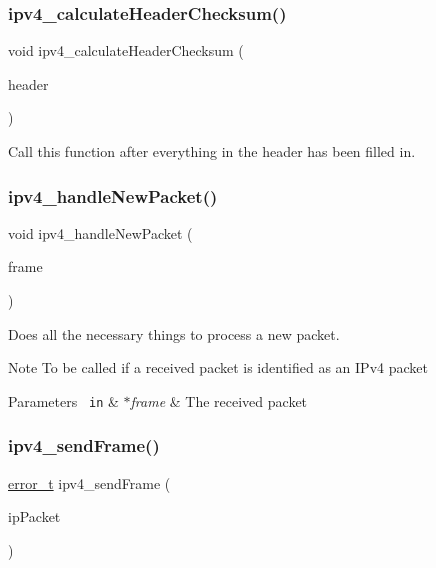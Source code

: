 \subsubsection{\texorpdfstring{ipv4\_calculateHeaderChecksum()}{ipv4\_calculateHeaderChecksum()}}
{\footnotesize\ttfamily void ipv4\+\_\+calculate\+Header\+Checksum (\begin{DoxyParamCaption}\item[{\mbox{\hyperlink{group__ipv4_gaf4f2c6743b9fb1ea3c69734612ce41de}{ipv4\+\_\+header\+\_\+t}} $\ast$}]{header }\end{DoxyParamCaption})}



Call this function after everything in the header has been filled in. 

\mbox{\label{group__ipv4_ga7f96d526bafe55783b675597634d87ae}} 
\subsubsection{\texorpdfstring{ipv4\_handleNewPacket()}{ipv4\_handleNewPacket()}}
{\footnotesize\ttfamily void ipv4\+\_\+handle\+New\+Packet (\begin{DoxyParamCaption}\item[{\mbox{\hyperlink{group__ethernet_ga7519a7ae14b490659069435698d28a25}{ethernet\+Frame\+\_\+t}} $\ast$}]{frame }\end{DoxyParamCaption})}



Does all the necessary things to process a new packet. 

\begin{DoxyNote}{Note}
To be called if a received packet is identified as an I\+Pv4 packet 
\end{DoxyNote}

\begin{DoxyParams}[1]{Parameters}
\mbox{\texttt{ in}}  & {\em $\ast$frame} & The received packet \\
\hline
\end{DoxyParams}
\mbox{\label{group__ipv4_ga1837c9c3c1856f57fe1d5ec5008015a2}} 
\subsubsection{\texorpdfstring{ipv4\_sendFrame()}{ipv4\_sendFrame()}}
{\footnotesize\ttfamily \mbox{\hyperlink{group__error_gad3ae44be85fe6952dcaed425499e8f6b}{error\+\_\+t}} ipv4\+\_\+send\+Frame (\begin{DoxyParamCaption}\item[{\mbox{\hyperlink{group__ipv4_ga68ea36d252d9332fd5e37d9aaedd06af}{ipv4\+\_\+packet\+\_\+t}}}]{ip\+Packet }\end{DoxyParamCaption})}



